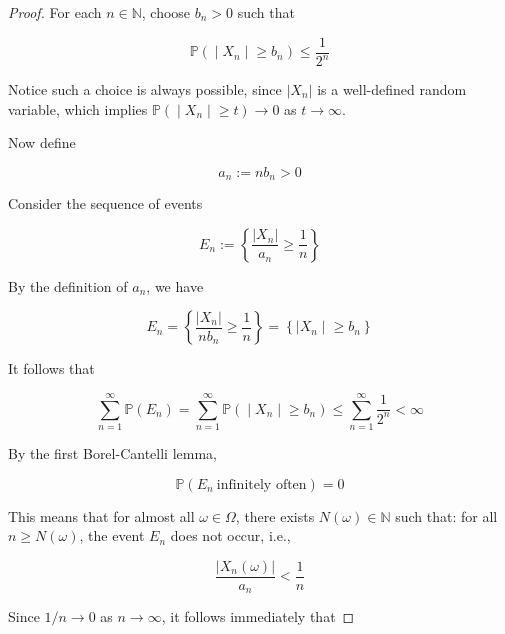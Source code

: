 \begin{proof}

For each \(\mathit{n} \in \mathbb{N}\), choose \(\mathit{b}_{\mathit{n}} > 0\) such that

\[\left. \mathbb{P}( \middle| \mathit{X}_{\mathit{n}} \middle| \geq \mathit{b}_{\mathit{n}}) \leq \frac{1}{2^{\mathit{n}}} \right.\]

Notice such a choice is always possible, since \(|\mathit{X}_{\mathit{n}}|\) is a well-defined random variable, which implies \(\left. \mathbb{P}( \middle| \mathit{X}_{\mathit{n}} \middle| \geq \mathit{t})\rightarrow 0 \right.\) as \(\mathit{t}\rightarrow\infty\).

Now define

\[\mathit{a}_{\mathit{n}} := \mathit{n}\mathit{b}_{\mathit{n}} > 0\]

Consider the sequence of events

\[\mathit{E}_{\mathit{n}} := \left\{ {\frac{|\mathit{X}_{\mathit{n}}|}{\mathit{a}_{\mathit{n}}} \geq \frac{1}{\mathit{n}}} \right\}\]

By the definition of \(\mathit{a}_{\mathit{n}}\), we have

\[\mathit{E}_{\mathit{n}} = \left\{ {\frac{|\mathit{X}_{\mathit{n}}|}{\mathit{n}\mathit{b}_{\mathit{n}}} \geq \frac{1}{\mathit{n}}} \right\} = \left\{ |\mathit{X}_{\mathit{n}} \middle| \geq \mathit{b}_{\mathit{n}} \right\}\]

It follows that

\[\left. \sum\limits_{\mathit{n} = 1}^{\infty}\mathbb{P}(\mathit{E}_{\mathit{n}}) = \sum\limits_{\mathit{n} = 1}^{\infty}\mathbb{P}( \middle| \mathit{X}_{\mathit{n}} \middle| \geq \mathit{b}_{\mathit{n}}) \leq \sum\limits_{\mathit{n} = 1}^{\infty}\frac{1}{2^{\mathit{n}}} < \infty \right.\]

By the first Borel-Cantelli lemma,

\[\mathbb{P}(\mathit{E}_{\mathit{n}}\ \text{infinitely often}) = 0\]

This means that for almost all \(\mathit{\omega} \in \Omega\), there exists \(\mathit{N}(\mathit{\omega}) \in \mathbb{N}\) such that: for all \(\mathit{n} \geq \mathit{N}(\mathit{\omega})\), the event \(\mathit{E}_{\mathit{n}}\) does not occur, i.e.,

\[\frac{|\mathit{X}_{\mathit{n}}(\mathit{\omega})|}{\mathit{a}_{\mathit{n}}} < \frac{1}{\mathit{n}}\]

Since \(1/\mathit{n}\rightarrow 0\) as \(\mathit{n}\rightarrow\infty\), it follows immediately that


\end{proof}
